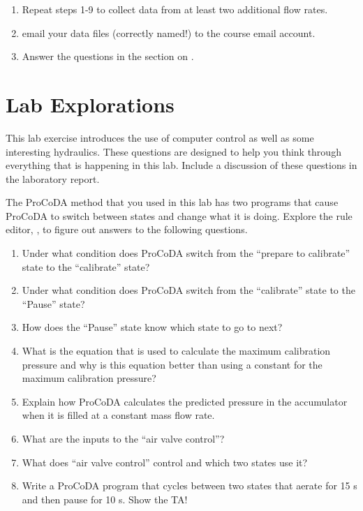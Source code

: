 \documentclass[letterpaper,10pt,english]{sphinxmanual}
\begin{document}
\begin{description}
\begin{enumerate}
\item {} 
Repeat steps 1-9 to collect data from at least two additional flow rates.

\item {} 
email your data files (correctly named!) to the course email account.

\item {} 
Answer the questions in the section on {\hyperref[\detokenize{Gas_Transfer/Gas_Transfer:heading-gas-transfer-lab-explorations}]{}}.

\end{enumerate}

\end{description}


\section{Lab Explorations}
\label{\detokenize{Gas_Transfer/Gas_Transfer:lab-explorations}}\label{\detokenize{Gas_Transfer/Gas_Transfer:heading-gas-transfer-lab-explorations}}
This lab exercise introduces the use of computer control as well as some interesting hydraulics. These questions are designed to help you think through everything that is happening in this lab. Include a discussion of these questions in the laboratory report.

The ProCoDA method that you used in this lab has two programs that cause ProCoDA to switch between states and change what it is doing. Explore the rule editor, , to figure out answers to the following questions.
\begin{enumerate}
\item {} 
Under what condition does ProCoDA switch from the “prepare to calibrate” state to the “calibrate” state?

\item {} 
Under what condition does ProCoDA switch from the “calibrate” state to the “Pause” state?

\item {} 
How does the “Pause” state know which state to go to next?

\item {} 
What is the equation that is used to calculate the maximum calibration pressure and why is this equation better than using a constant for the maximum calibration pressure?

\item {} 
Explain how ProCoDA calculates the predicted pressure in the accumulator when it is filled at a constant mass flow rate.

\item {} 
What are the inputs to the “air valve control”?

\item {} 
What does “air valve control” control and which two states use it?

\item {} 
Write a ProCoDA program that cycles between two states that aerate for 15 s and then pause for 10 s. Show the TA!

\end{enumerate}
\end{document}
